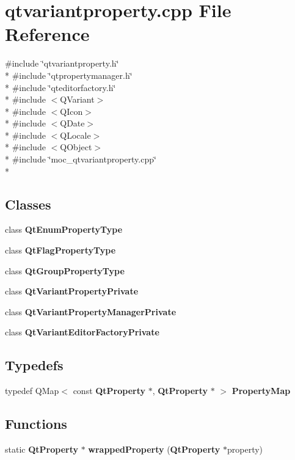 \section{qtvariantproperty.\+cpp File Reference}
\label{qtvariantproperty_8cpp}
{\ttfamily \#include \char`\"{}qtvariantproperty.\+h\char`\"{}}\\*
{\ttfamily \#include \char`\"{}qtpropertymanager.\+h\char`\"{}}\\*
{\ttfamily \#include \char`\"{}qteditorfactory.\+h\char`\"{}}\\*
{\ttfamily \#include $<$Q\+Variant$>$}\\*
{\ttfamily \#include $<$Q\+Icon$>$}\\*
{\ttfamily \#include $<$Q\+Date$>$}\\*
{\ttfamily \#include $<$Q\+Locale$>$}\\*
{\ttfamily \#include $<$Q\+Object$>$}\\*
{\ttfamily \#include \char`\"{}moc\+\_\+qtvariantproperty.\+cpp\char`\"{}}\\*
\subsection*{Classes}
\begin{DoxyCompactItemize}
\item 
class {\bf Qt\+Enum\+Property\+Type}
\item 
class {\bf Qt\+Flag\+Property\+Type}
\item 
class {\bf Qt\+Group\+Property\+Type}
\item 
class {\bf Qt\+Variant\+Property\+Private}
\item 
class {\bf Qt\+Variant\+Property\+Manager\+Private}
\item 
class {\bf Qt\+Variant\+Editor\+Factory\+Private}
\end{DoxyCompactItemize}
\subsection*{Typedefs}
\begin{DoxyCompactItemize}
\item 
typedef Q\+Map$<$ const {\bf Qt\+Property} $\ast$, {\bf Qt\+Property} $\ast$ $>$ {\bf Property\+Map}
\end{DoxyCompactItemize}
\subsection*{Functions}
\begin{DoxyCompactItemize}
\item 
static {\bf Qt\+Property} $\ast$ {\bf wrapped\+Property} ({\bf Qt\+Property} $\ast$property)
\end{DoxyCompactItemize}



